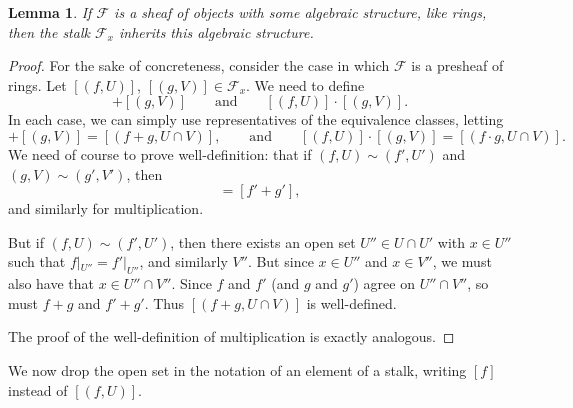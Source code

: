 \documentclass[a4paper,10pt]{scrreprt}
\theoremstyle{definition}
\theoremstyle{plain}
\newtheorem{lemma}{Lemma}[section]
\theoremstyle{remark}
\begin{document}
\begin{lemma}
  If $\mathcal{F}$ is a sheaf of objects with some algebraic structure, like rings, then the stalk $\mathcal{F}_{x}$ inherits this algebraic structure. 
\end{lemma}
\begin{proof}
  For the sake of concreteness, consider the case in which $\mathcal{F}$ is a presheaf of rings. Let $[(f, U)]$, $[(g, V)] \in \mathcal{F}_{x}$. We need to define 
  \begin{equation*}
    [(f, U)] + [(g, V)]\qquad\text{and}\qquad [(f, U)] \cdot [(g, V)].
  \end{equation*}
  In each case, we can simply use representatives of the equivalence classes, letting
  \begin{equation*}
    [(f, U)] + [(g, V)] = [(f+g, U \cap V)],\qquad\text{and}\qquad[(f, U)]\cdot [(g, V)] = [(f\cdot g, U \cap V)].
  \end{equation*}
  We need of course to prove well-definition: that if $(f, U) \sim (f', U')$ and $(g, V) \sim (g', V')$, then
  \begin{equation*}
    [f+g] = [f'+g'],
  \end{equation*}
  and similarly for multiplication.

  But if $(f, U) \sim (f', U')$, then there exists an open set $U'' \in U \cap U'$ with $x \in U''$ such that $f|_{U''} = f'|_{U''}$, and similarly $V''$. But since $x \in U''$ and $x \in V''$, we must also have that $x \in U'' \cap V''$. Since $f$ and $f'$ (and $g$ and $g'$) agree on $U'' \cap V''$, so must $f+g$ and $f' + g'$. Thus $[(f + g, U \cap V)]$ is well-defined.

  The proof of the well-definition of multiplication is exactly analogous.
\end{proof}

We now drop the open set in the notation of an element of a stalk, writing $[f]$ instead of $[(f, U)]$.
\end{document}
